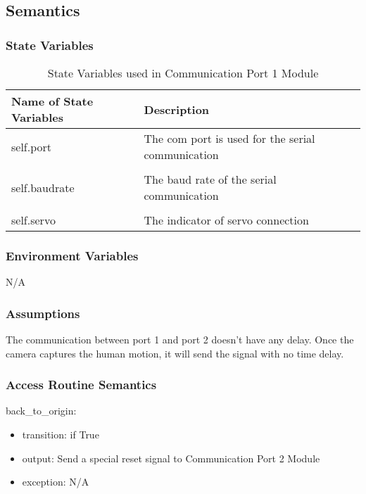 \documentclass[12pt, titlepage]{article}
\begin{document}
\subsection{Semantics}

\subsubsection{State Variables}

\begin{table}[H]
\caption{State Variables used in Communication Port 1 Module} 
\begin{tabularx}{\textwidth}{XX}
\toprule
\textbf{Name of State Variables} & \textbf{Description}\\
\midrule
self.port & The com port is used for the serial communication\\\\
self.baudrate & The baud rate of the serial communication\\\\
self.servo & The indicator of servo connection\\


\bottomrule
\end{tabularx}
\end{table}

\subsubsection{Environment Variables}
N/A


\subsubsection{Assumptions}

The communication between port 1 and port 2 doesn't have any delay. Once the camera captures the human motion, it will send the signal with no time delay.

\subsubsection{Access Routine Semantics}

\noindent back\_to\_origin:
\begin{itemize}
\item transition: if True  
\item output: Send a special reset signal to Communication Port 2 Module 
\item exception: N/A 
\end{itemize}
\end{document}
